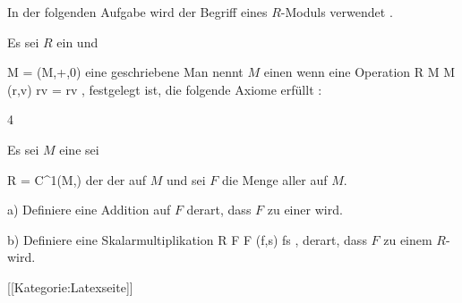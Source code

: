 In der folgenden Aufgabe wird der Begriff eines $R$-Moduls verwendet
 {} {.}

Es sei $R$ ein
und

\mavergleichskette
{\vergleichskette
{ M
}
{ = }{ (M,+,0)
}
{  }{
}
{    }{
}
{   }{
}
}
{}{}{}
eine  {} geschriebene
Man nennt $M$ einen
wenn eine Operation
\maabbeledisp {} {R \times M } { M
} {(r,v)} { rv = r\cdot v
} {,}
 {} {}
festgelegt ist, die folgende Axiome erfüllt
 {} {:}

{4}
{

Es sei $M$ eine
sei

\mavergleichskette
{\vergleichskette
{ R
}
{ = }{ C^1(M,\R)
}
{  }{
}
{    }{
}
{   }{
}
}
{}{}{}
der
der
auf $M$ und sei $F$ die Menge aller
auf $M$.

a) Definiere eine Addition auf $F$ derart, dass $F$ zu einer
wird.

b) Definiere eine Skalarmultiplikation
\maabbeledisp {} {R \times F } { F
} {(f,s)} {fs
} {,}
derart, dass $F$ zu einem
$R$-
wird.

}
{} {}

 [[Kategorie:Latexseite]]
